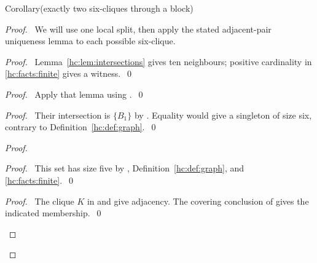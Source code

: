 \begin{mergedproofsection}
\begin{namedresult}{Corollary}{(exactly two six-cliques through a block)}\label{hc:cor:two}
 \leavevmode\par
\end{namedresult}
\begin{proof}
 \pfsketch\ We will use one local split, then apply the stated
 adjacent-pair uniqueness lemma to each possible six-clique.
 \begin{proof}\pf\ Lemma~\ref{hc:lem:intersections} gives ten
  neighbours; positive cardinality in \ref{hc:facts:finite} gives a witness.~\qed\end{proof}
 \begin{proof}\pf\ Apply that lemma using .~\qed\end{proof}
 \begin{proof}\pf\ Their intersection is $\{B_1\}$ by
  . Equality would give a singleton of size
  six, contrary to Definition~\ref{hc:def:graph}.~\qed\end{proof}
 \begin{proof}
  \begin{proof}\pf\ This set has size five by ,
   Definition~\ref{hc:def:graph}, and \ref{hc:facts:finite}.~\qed\end{proof}
  \begin{proof}\pf\ The clique $K$ in  and
    give adjacency. The covering conclusion
   of  gives the indicated membership.~\qed\end{proof}

\end{proof}
\end{proof}
\end{mergedproofsection}
